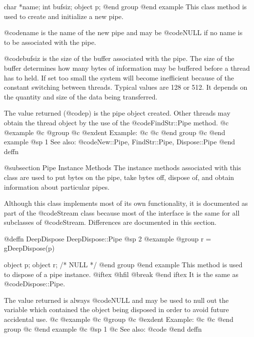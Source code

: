 char    *name;
int     bufsiz;
object  p;
@end group
@end example
This class method is used to create and initialize a new pipe.

@code{name} is the name of the new pipe and may be @code{NULL} if
no name is to be associated with the pipe.

@code{bufsiz} is the size of the buffer associated with the pipe.  The
size of the buffer determines how many bytes of information may be
buffered before a thread has to held.  If set too small the system will
become inefficient because of the constant switching between threads.
Typical values are 128 or 512.  It depends on the quantity and size of
the data being transferred.

The value returned (@code{p}) is the pipe object created.  Other
threads may obtain the thread object by the use of the @code{FindStr::Pipe}
method.  
@c @example
@c @group
@c @exdent Example:
@c 
@c @end group
@c @end example
@sp 1
See also:  @code{New::Pipe, FindStr::Pipe, Dispose::Pipe}
@end deffn



















@subsection Pipe Instance Methods
The instance methods associated with this class are used to put bytes
on the pipe, take bytes off, dispose of, and obtain information
about particular pipes.

Although this class implements most of its own functionality, it is
documented as part of the @code{Stream} class because most of the
interface is the same for all subclasses of @code{Stream}.  Differences
are documented in this section.













@deffn {DeepDispose} DeepDispose::Pipe
@sp 2
@example
@group
r = gDeepDispose(p)

object  p;
object  r;     /*  NULL  */
@end group
@end example
This method is used to dispose of a pipe instance.  
@iftex
@hfil @break 
@end iftex
It is the same as @code{Dispose::Pipe}.

The value returned is always @code{NULL} and may be used to null out
the variable which contained the object being disposed in order to
avoid future accidental use.
@c @example
@c @group
@c @exdent Example:
@c 
@c @end group
@c @end example
@c @sp 1
@c See also:  @code{}
@end deffn








